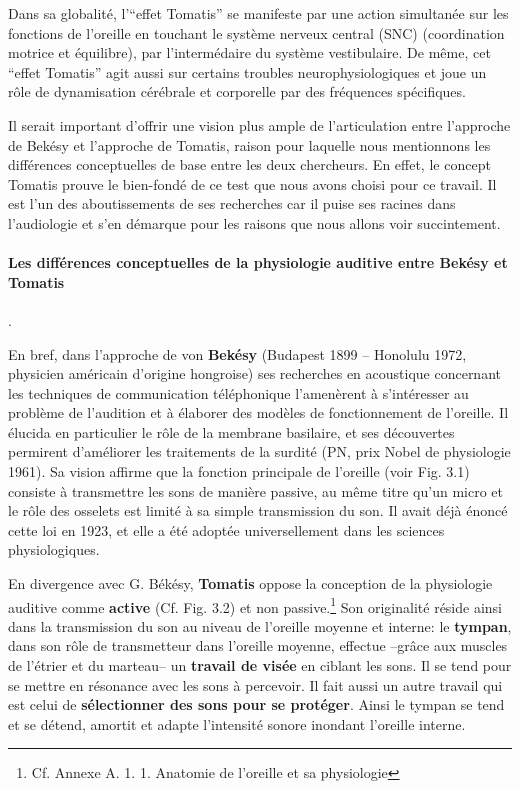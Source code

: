Dans sa globalité, l'``effet Tomatis'' se manifeste par une action
simultanée sur les fonctions de
l'oreille en touchant le système nerveux central (SNC) (coordination
                motrice et équilibre), par l'intermédaire du système
                vestibulaire.
                De même, cet ``effet Tomatis'' agit aussi sur certains troubles
                neurophysiologiques et  joue un rôle de dynamisation cérébrale et corporelle
                par des fréquences spécifiques.


Il serait important d'offrir une vision plus ample de
l'articulation entre l'approche de Bekésy et l'approche de Tomatis,
raison pour laquelle nous mentionnons les différences conceptuelles de
base entre les deux chercheurs.
En effet, le concept Tomatis prouve le bien-fondé de ce test que nous
avons choisi pour ce travail.
Il est l'un des aboutissements de
ses recherches car il puise ses racines dans l'audiologie et s'en
démarque pour les raisons que nous allons voir succintement.
\paragraph{Les différences conceptuelles de la physiologie auditive
  entre Bekésy et Tomatis}.

En bref, dans  l'approche de von\textbf{ Bekésy} (Budapest 1899 -- Honolulu 1972,
physicien américain d'origine hongroise) ses
recherches en acoustique concernant les techniques de communication
téléphonique l'amenèrent à s'intéresser au problème de l'audition et à
élaborer des modèles de fonctionnement de l'oreille. Il élucida en
particulier le rôle de la membrane basilaire, et ses découvertes
permirent d'améliorer les traitements de la surdité (PN, prix
Nobel de physiologie 1961).
Sa vision affirme que la fonction principale de l'oreille (voir
Fig. 3.1)
consiste à transmettre les sons de manière passive, au même titre qu'un micro et le rôle des osselets
est limité à sa simple transmission du
son. Il avait déjà énoncé cette loi en 1923, et elle a été adoptée
universellement dans les sciences physiologiques.


En divergence avec G. Békésy, \textbf{Tomatis} oppose la conception de la
physiologie auditive comme \textbf{active} (Cf. Fig. 3.2) et non
passive.\footnote{Cf. Annexe A. 1. 1. Anatomie de l'oreille et sa physiologie}
Son originalité réside ainsi dans la transmission du son
au niveau de l'oreille moyenne et interne:
le \textbf{tympan}, dans son rôle de transmetteur dans l'oreille
          moyenne, effectue --grâce aux muscles de l'étrier et du marteau--
		un\textbf{ travail de visée} en ciblant les sons. Il
se tend
		pour se mettre en résonance avec les sons à percevoir.
                Il fait aussi un autre travail qui est celui de \textbf{sélectionner des
sons
		pour se protéger}. Ainsi le tympan se tend et se détend,
              amortit et adapte
l'intensité
		sonore inondant  l'oreille interne.


